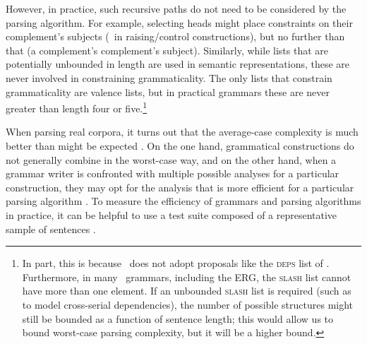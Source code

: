 \documentclass[output=paper,nonflat]{langsci/langscibook}
\begin{document}
However, in practice, such recursive paths do not need to be considered by the parsing algorithm.
For example, selecting heads might place constraints on their complement's subjects
(\eg\ in raising/control constructions),
but no further than that (\eg a complement's complement's subject).
Similarly, while lists that are potentially unbounded in length are used in semantic representations,
these are never involved in constraining grammaticality.
The only lists that constrain grammaticality are valence lists,
but in practical grammars these are never greater than length four or five.\footnote{%
	In part, this is because \delphin\ does not
	adopt proposals like the \textsc{deps} list of \citet*{BMS2001a-unlinked}.
	Furthermore, in many \delphin\ grammars, including the ERG,
	the \textsc{slash} list cannot have more than one element.
	If an unbounded \textsc{slash} list is required
	(such as to model cross-serial dependencies),
	the number of possible structures might still be bounded as a function of sentence length;
	this would allow us to bound worst-case parsing complexity,
	but it will be a higher bound.
}

When parsing real corpora,
it turns out that the average-case complexity is much better than might be expected \citep{Carroll94}.
On the one hand, grammatical constructions do not generally combine in the worst-case way,
and on the other hand, when a grammar writer is confronted
with multiple possible analyses for a particular construction,
they may opt for the analysis that is more efficient for a particular parsing algorithm \citep{Flickinger2000a}.
To measure the efficiency of grammars and parsing algorithms in practice,
it can be helpful to use a test suite composed of a representative sample of sentences \citep{OF98}.

\end{document}
